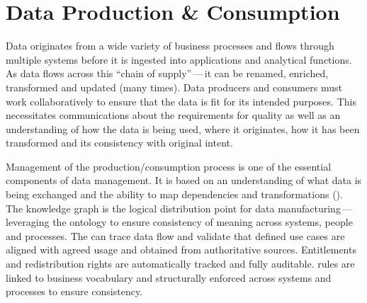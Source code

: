\section{Data Production \& Consumption}\label{sec:ekgmm-b-4-3} %

Data originates from a wide variety of business processes and flows through multiple systems before it is
ingested into applications and analytical functions.
As data flows across this “chain of supply”\,---\,it can be renamed, enriched, transformed and updated (many times).
Data producers and consumers must work collaboratively to ensure that the data is fit for its intended purposes.
This necessitates communications about the requirements for quality as well as an understanding of
how the data is being used, where it originates, how it has been transformed and its consistency with original intent.

\ekgmmContextSection

Management of the production/consumption process is one of the essential components of data management.
It is based on an understanding of what data is being exchanged and the ability to map dependencies and
transformations ().
The knowledge graph is the logical distribution point for data manufacturing\,---\,leveraging the ontology to ensure
consistency of meaning across systems, people and processes.
The  can trace data flow and validate that defined use cases are aligned with agreed usage and
obtained from authoritative sources.
Entitlements and redistribution rights are automatically tracked and fully auditable.
 rules are linked to business vocabulary and structurally enforced across systems and processes
to ensure consistency.

\kgmmcorequestionssection

